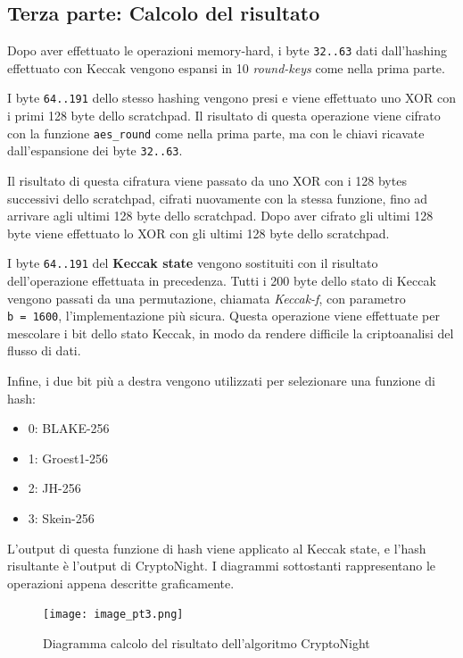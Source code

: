\subsection{Terza parte: Calcolo del risultato}\label{terza-parte-calcolo-del-risultato}
Dopo aver effettuato le operazioni memory-hard, i byte \texttt{32..63}
dati dall'hashing effettuato con Keccak vengono espansi in 10
\emph{round-keys} come nella prima parte.

I byte \texttt{64..191} dello stesso hashing vengono presi e viene
effettuato uno XOR con i primi 128 byte dello scratchpad. Il risultato
di questa operazione viene cifrato con la funzione \texttt{aes\_round}
come nella prima parte, ma con le chiavi ricavate dall'espansione dei
byte \texttt{32..63}.

Il risultato di questa cifratura viene passato da uno XOR con i 128
bytes successivi dello scratchpad, cifrati nuovamente con la stessa
funzione, fino ad arrivare agli ultimi 128 byte dello scratchpad. Dopo
aver cifrato gli ultimi 128 byte viene effettuato lo XOR con gli ultimi
128 byte dello scratchpad.

I byte \texttt{64..191} del \textbf{Keccak state} vengono sostituiti con il
risultato dell'operazione effettuata in precedenza. Tutti i 200 byte
dello stato di Keccak vengono passati da una permutazione, chiamata
\emph{Keccak-f}, con parametro \texttt{b\ =\ 1600}, l'implementazione
più sicura. Questa operazione viene effettuate per mescolare i bit dello
stato Keccak, in modo da rendere difficile la criptoanalisi del flusso
di dati.

Infine, i due bit più a destra vengono utilizzati per selezionare una
funzione di hash:

\begin{itemize}
  \item 
  0: BLAKE-256\cite{aumasson2008sha}
  \item
  1: Groest1-256\cite{groestl}
  \item 
  2: JH-256\cite{jh}
  \item 
  3: Skein-256\cite{skein}
\end{itemize}

L'output di questa funzione di hash viene applicato al Keccak state, e
l'hash risultante è l'output di CryptoNight. I diagrammi sottostanti rappresentano le operazioni
appena descritte graficamente.

\begin{figure}[h!]
  \centering
  \texttt{[image: image\_pt3.png]}
  \caption{Diagramma calcolo del risultato dell'algoritmo CryptoNight}
\end{figure}